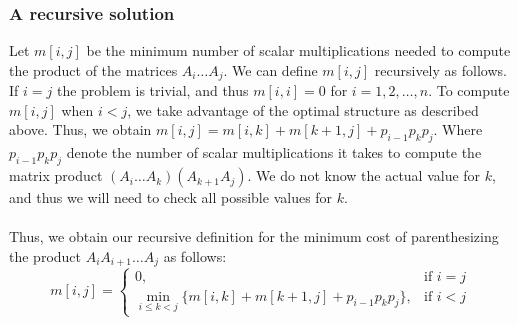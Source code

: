 \documentclass[a4paper]{article}
\begin{document}
\subsubsection{A recursive solution}
Let $m[i,j]$ be the minimum number of scalar multiplications needed to compute the product of the matrices $A_i\dots A_j$. We can define $m[i,j]$ recursively as follows. If $i=j$ the problem is trivial, and thus $m[i,i] = 0$ for $i=1,2,\dots,n$. To compute $m[i,j]$ when $i<j$, we take advantage of the optimal structure as described above. Thus, we obtain $m[i,j] = m[i,k] + m[k+1,j] + p_{i-1}p_kp_j$. Where $p_{i-1}p_kp_j$ denote the number of scalar multiplications it takes to compute the matrix product $(A_i\dots A_k)(A_{k+1}A_j)$. We do not know the actual value for $k$, and thus we will need to check all possible values for $k$.\\ \\
Thus, we obtain our recursive definition for the minimum cost of parenthesizing the product $A_iA_{i+1}\dots A_j$ as follows:
\[
m[i,j]=
\begin{cases}
0, & \text{if } i=j\\
\min\limits_{i\le k < j} \{m[i,k]+m[k+1, j]+p_{i-1}p_kp_j\}, & \text{if } i < j
\end{cases}
\]
\end{document}
